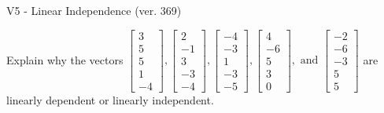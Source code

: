 \begin{exercise}
  \begin{exerciseTitle}V5 - Linear Independence (ver. 369)\end{exerciseTitle}
  \begin{exerciseStatement}
    Explain why the vectors \(\left[\begin{array}{r}
3 \\
5 \\
5 \\
1 \\
-4
\end{array}\right] , \left[\begin{array}{r}
2 \\
-1 \\
3 \\
-3 \\
-4
\end{array}\right] , \left[\begin{array}{r}
-4 \\
-3 \\
1 \\
-3 \\
-5
\end{array}\right] , \left[\begin{array}{r}
4 \\
-6 \\
5 \\
3 \\
0
\end{array}\right] , \text{ and } \left[\begin{array}{r}
-2 \\
-6 \\
-3 \\
5 \\
5
\end{array}\right]\) are linearly dependent or linearly independent.	



\end{exerciseStatement}
\end{exercise}

